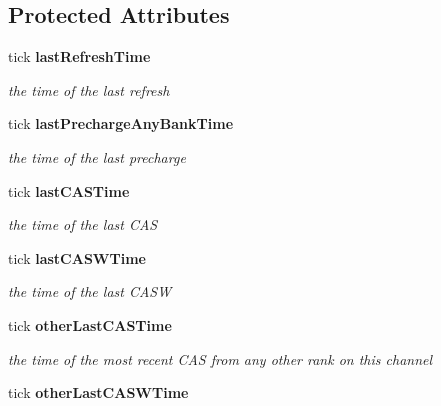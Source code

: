 \subsection*{Protected Attributes}
\begin{CompactItemize}
\item 
tick {\bf lastRefreshTime}\label{class_d_r_a_msim_i_i_1_1_rank_578cb670379069e5da1d4c6adfb8b9a2}

\begin{CompactList}\small\item\em the time of the last refresh \item\end{CompactList}\item 
tick {\bf lastPrechargeAnyBankTime}\label{class_d_r_a_msim_i_i_1_1_rank_23d9e3d09a3e91d61836dee2e03417d9}

\begin{CompactList}\small\item\em the time of the last precharge \item\end{CompactList}\item 
tick {\bf lastCASTime}\label{class_d_r_a_msim_i_i_1_1_rank_ca702047caedeece756f58cd22bcf643}

\begin{CompactList}\small\item\em the time of the last CAS \item\end{CompactList}\item 
tick {\bf lastCASWTime}\label{class_d_r_a_msim_i_i_1_1_rank_d25621bb78bc5740af9c467022ad5ff1}

\begin{CompactList}\small\item\em the time of the last CASW \item\end{CompactList}\item 
tick {\bf otherLastCASTime}\label{class_d_r_a_msim_i_i_1_1_rank_793b3e2860f080b65859b8c64722182a}

\begin{CompactList}\small\item\em the time of the most recent CAS from any other rank on this channel \item\end{CompactList}\item 
tick {\bf otherLastCASWTime}\label{class_d_r_a_msim_i_i_1_1_rank_77dd4d8609b160c5ec6db3191a4d87d3}


\end{CompactItemize}
